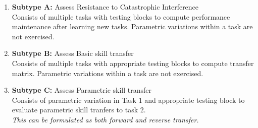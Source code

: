 \begin{enumerate}
    \item \textbf{Subtype A:} Assess Resistance to Catastrophic Interference\\
        Consists of multiple tasks with testing blocks to compute performance maintenance after learning new tasks. Parametric variations within a task are not exercised.\\
                    
    \item \textbf{Subtype B:} Assess Basic skill transfer\\
        Consists of multiple tasks with appropriate testing blocks to compute transfer matrix. Parametric variations within a task are not exercised.\\
            
    \item \textbf{Subtype C:} Assess Parametric skill transfer\\
        Consists of parametric variation in Task 1 and appropriate testing block to evaluate parametric skill tranfers to task 2.\\
        \textit{This can be formulated as both forward and reverse transfer.}\\
\end{enumerate}

\iffalse

